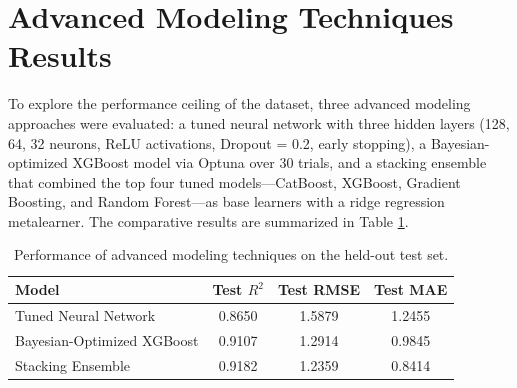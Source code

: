 \section{Advanced Modeling Techniques Results}

To explore the performance ceiling of the dataset, three advanced modeling approaches were evaluated: a tuned neural network with three hidden layers (128, 64, 32 neurons, ReLU activations, Dropout = 0.2, early stopping), a Bayesian-optimized XGBoost model via Optuna over 30 trials, and a stacking ensemble that combined the top four tuned models—CatBoost, XGBoost, Gradient Boosting, and Random Forest—as base learners with a ridge regression metalearner. The comparative results are summarized in Table \ref{tab:advanced_performance}\cite{atique2026explainable}.

\begin{table}[H]
\centering
\setlength{\arrayrulewidth}{1.8pt}
\renewcommand{\arraystretch}{1.2}

\begin{tabular}{|l|c|c|c|}
\hline
\textbf{Model} & \textbf{Test \(R^2\)} & \textbf{Test RMSE} & \textbf{Test MAE} \\
\hline
Tuned Neural Network       & 0.8650 & 1.5879 & 1.2455 \\
\hline
Bayesian-Optimized XGBoost & 0.9107 & 1.2914 & 0.9845 \\
\hline
Stacking Ensemble          & 0.9182 & 1.2359 & 0.8414 \\
\hline
\end{tabular}
\caption{Performance of advanced modeling techniques on the held-out test set.}
\label{tab:advanced_performance}
\end{table}

